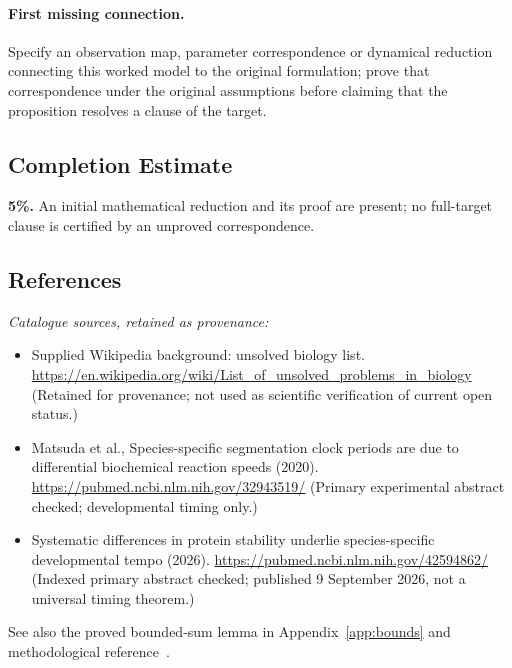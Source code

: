 \documentclass[11pt]{article}
\begin{document}
\paragraph{First missing connection.} Specify an observation map, parameter correspondence or dynamical reduction connecting this worked model to the original formulation; prove that correspondence under the original assumptions before claiming that the proposition resolves a clause of the target.
\subsection{Completion Estimate}
\textbf{5\%.} An initial mathematical reduction and its proof are present; no full-target clause is certified by an unproved correspondence.
\subsection{References}
\noindent\emph{Catalogue sources, retained as provenance:}
\begin{itemize}
\item Supplied Wikipedia background: unsolved biology list. \url{https://en.wikipedia.org/wiki/List_of_unsolved_problems_in_biology} (Retained for provenance; not used as scientific verification of current open status.)
\item Matsuda et al., Species-specific segmentation clock periods are due to differential biochemical reaction speeds (2020). \url{https://pubmed.ncbi.nlm.nih.gov/32943519/} (Primary experimental abstract checked; developmental timing only.)
\item Systematic differences in protein stability underlie species-specific developmental tempo (2026). \url{https://pubmed.ncbi.nlm.nih.gov/42594862/} (Indexed primary abstract checked; published 9 September 2026, not a universal timing theorem.)
\end{itemize}
\noindent See also the proved bounded-sum lemma in Appendix~\ref{app:bounds} and methodological reference~\cite{hoeffding}.
\end{document}
